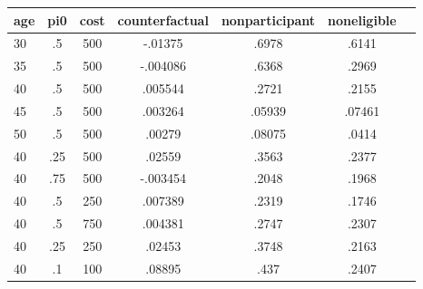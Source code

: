 \begin{table}[htbp]
\begin{tabular}{lcccccc} \hline \hline
 \multicolumn{1}{c}{ age }  & pi0  & cost  & counterfactual  & nonparticipant  & noneligible  \\  \hline 
       30 &        .5 &       500 &   -.01375 &     .6978 &     .6141 \\  
       35 &        .5 &       500 &  -.004086 &     .6368 &     .2969 \\  
       40 &        .5 &       500 &   .005544 &     .2721 &     .2155 \\  
       45 &        .5 &       500 &   .003264 &    .05939 &    .07461 \\  
       50 &        .5 &       500 &    .00279 &    .08075 &     .0414 \\  
       40 &       .25 &       500 &    .02559 &     .3563 &     .2377 \\  
       40 &       .75 &       500 &  -.003454 &     .2048 &     .1968 \\  
       40 &        .5 &       250 &   .007389 &     .2319 &     .1746 \\  
       40 &        .5 &       750 &   .004381 &     .2747 &     .2307 \\  
       40 &       .25 &       250 &    .02453 &     .3748 &     .2163 \\  
       40 &        .1 &       100 &    .08895 &      .437 &     .2407 \\  
\hline \hline \end{tabular}
\end{table}
